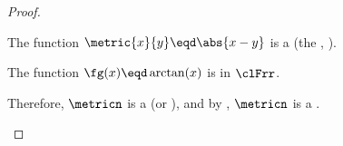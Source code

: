 \begin{proof}
\begin{enume}
  \item The function $\metric{x}{y}\eqd\abs{x-y}$ is a  (the , ).
  \item The function  $\fg(x)\eqd\arctan(x)$ is  in $\clFrr$.
  \item Therefore, $\metricn$ is a  (or ), 
        and by , $\metricn$ is a .
\end{enume}
\end{proof}

